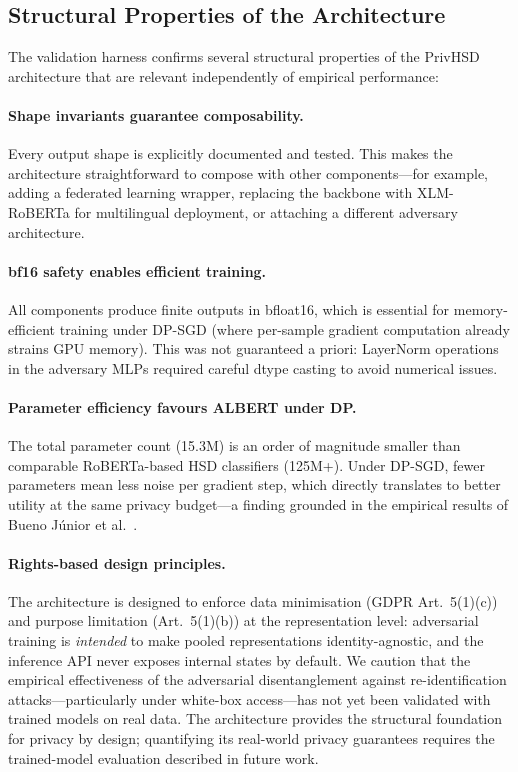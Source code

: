 \documentclass{article}
\begin{document}
\subsection{Structural Properties of the Architecture}

The validation harness confirms several structural properties of the
PrivHSD architecture that are relevant independently of empirical
performance:

\paragraph{Shape invariants guarantee composability.}
Every output shape is explicitly documented and tested. This makes the
architecture straightforward to compose with other components---for
example, adding a federated learning wrapper, replacing the backbone
with XLM-RoBERTa for multilingual deployment, or attaching a different
adversary architecture.

\paragraph{bf16 safety enables efficient training.}
All components produce finite outputs in bfloat16, which is essential for
memory-efficient training under DP-SGD (where per-sample gradient
computation already strains GPU memory). This was not guaranteed a
priori: LayerNorm operations in the adversary MLPs required careful
dtype casting to avoid numerical issues.

\paragraph{Parameter efficiency favours ALBERT under DP.}
The total parameter count (15.3M) is an order of magnitude smaller than
comparable RoBERTa-based HSD classifiers (125M+). Under DP-SGD, fewer
parameters mean less noise per gradient step, which directly translates
to better utility at the same privacy budget---a finding grounded in
the empirical results of Bueno J\'unior et al.~\cite{bueno2025privacy}.

\paragraph{Rights-based design principles.}
The architecture is designed to enforce data minimisation
(GDPR Art.~5(1)(c)) and purpose limitation (Art.~5(1)(b)) at the
representation level: adversarial training is \emph{intended} to make
pooled representations identity-agnostic, and the inference API never
exposes internal states by default.
We caution that the empirical effectiveness of the adversarial
disentanglement against re-identification attacks---particularly
under white-box access---has not yet been validated with trained
models on real data.
The architecture provides the structural foundation for privacy by design;
quantifying its real-world privacy guarantees requires the trained-model
evaluation described in future work.
\end{document}
